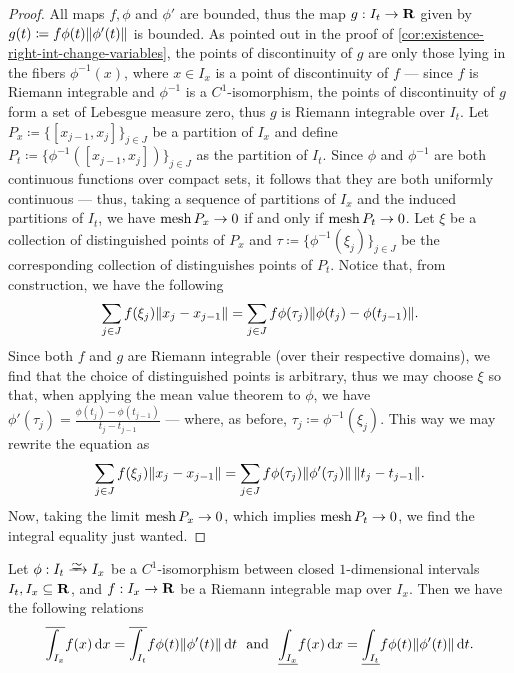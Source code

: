 \begin{proof}
All maps \(f, \phi\) and \(\phi'\) are bounded, thus the map \(g: I_t \to \mathbf{R}\)
given by \(g(t) \coloneq f \phi(t) \lVert\phi'(t)\rVert\) is bounded. As pointed out
in the proof of \cref{cor:existence-right-int-change-variables}, the points of
discontinuity of \(g\) are only those lying in the fibers \(\phi^{-1}(x)\),
where \(x \in I_x\) is a point of discontinuity of \(f\) --- since \(f\) is
Riemann integrable and \(\phi^{-1}\) is a \(C^1\)-isomorphism, the points of
discontinuity of \(g\) form a set of Lebesgue measure zero, thus \(g\) is
Riemann integrable over \(I_t\). Let \(P_x \coloneq \{[x_{j-1}, x_{j}]\}_{j \in
J}\) be a partition of \(I_x\) and define \(P_t \coloneq \{\phi^{-1}([x_{j-1},
x_j])\}_{j \in J}\) as the partition of \(I_t\). Since \(\phi\) and
\(\phi^{-1}\) are both continuous functions over compact sets, it follows that
they are both uniformly continuous --- thus, taking a sequence of partitions
of \(I_x\) and the induced partitions of \(I_t\), we have \(\operatorname{mesh} P_x \to 0\) if
and only if \(\operatorname{mesh} P_t \to 0\). Let \(\xi\) be a collection of distinguished
points of \(P_x\) and \(\tau \coloneq \{\phi^{-1}(\xi_{j})\}_{j \in J}\) be the
corresponding collection of distinguishes points of \(P_t\). Notice that,
from construction, we have the following
\[
  \sum_{j \in J} f(\xi_{j}) \lVert x_j - x_{j-1}\rVert
  = \sum_{j \in J} f \phi(\tau_j) \lVert\phi(t_j) - \phi(t_{j-1})\rVert.
\]
Since both \(f\) and \(g\) are Riemann integrable (over their respective
domains), we find that the choice of distinguished points is arbitrary, thus we
may choose \(\xi\) so that, when applying the mean value theorem to \(\phi\), we
have \(\phi'(\tau_j) = \frac{\phi(t_j) - \phi(t_{j-1})}{t_j - t_{j-1}}\) ---
where, as before, \(\tau_j \coloneq \phi^{-1}(\xi_j)\). This way we may rewrite
the equation as
\[
  \sum_{j \in J} f(\xi_{j}) \lVert x_j - x_{j-1}\rVert
  = \sum_{j \in J} f \phi(\tau_{j}) \lVert\phi'(\tau_{j})\rVert\,
  \lVert t_j - t_{j - 1}\rVert.
\]
Now, taking the limit \(\operatorname{mesh} P_x \to 0\), which implies \(\operatorname{mesh} P_t \to 0\), we
find the integral equality just wanted.
\end{proof}

\begin{corollary}
\label{cor:C1-isomorphism-intervals-upper-lower-integral}
Let \(\phi: I_t \isoto I_x\) be a \(C^1\)-isomorphism between closed
\(1\)-dimensional intervals \(I_t, I_x \subseteq \mathbf{R}\), and \(f: I_x \to \mathbf{R}\) be
a Riemann integrable map over \(I_{x}\). Then we have the following relations
\[
  \overline{\int_{I_x}} f(x)\, \mathrm{d} x
  = \overline{\int_{I_t}} f \phi(t) \lVert\phi'(t)\rVert\, \mathrm{d} t
  \ \text{ and }\
  \underline{\int_{I_x}} f(x)\, \mathrm{d} x
  = \underline{\int_{I_t}} f \phi(t) \lVert\phi'(t)\rVert\, \mathrm{d} t.
\]
\end{corollary}

